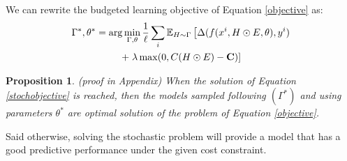 \documentclass[10pt,twocolumn,letterpaper]{article}
\newtheorem{mytheo}{Proposition}
\begin{document}
We can rewrite the budgeted learning objective of Equation \ref{objective} as:
\begin{multline} \label{stochobjective}
 \Gamma^* , \theta^* = \arg \min\limits_{\Gamma,\theta} \frac{1}{\ell} \sum\limits_i \mathbb{E}_{H \sim \Gamma}\left[ \Delta(f(x^i,H \odot E, \theta),y^i) \right. \\+ \left. \lambda \max (0,C(H \odot E)-\mathbf{C}) \vphantom{\Delta}\right]
\end{multline}

\begin{mytheo}
\label{prop1} (proof in Appendix) 
When the solution of Equation \ref{stochobjective} is reached, then the models sampled following $(\Gamma^*)$ and using parameters $\theta^*$ are optimal solution of the problem of Equation \ref{objective}. 
\end{mytheo}

Said otherwise, solving the stochastic problem will provide a model that has a good predictive performance under the given cost constraint. 


\end{document}
